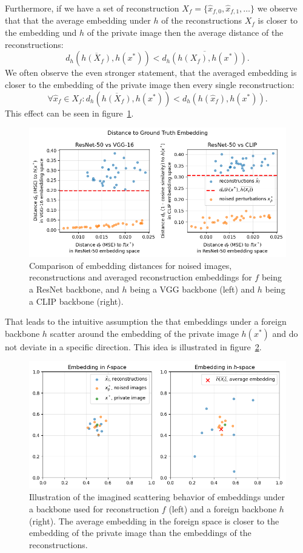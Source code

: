 \documentclass[10pt,twocolumn]{article}
\begin{document}
Furthermore, if we have a set of reconstruction $X_f = \{\hat x_{f,0}, \hat x_{f,1}, \dots\}$ we observe that that the average embedding under $h$ of the reconstructions $X_f$ is closer to the embedding und $h$ of the private image then the average distance of the reconstructions: $$d_h\left(\overline{h(X_f)}, h(x^*)\right) < \overline{d_h(h(X_f), h(x^*))}.$$
We often observe the even stronger statement, that the averaged embedding is closer to the embedding of the private image then every single reconstruction: $$\forall\hat x_f \in X_f: d_h\left(\overline{h(X_f)}, h(x^*)\right) < d_h(h(\hat x_f), h(x^*)).$$
This effect can be seen in figure~\ref{fig:avg_distance_scatter}.
\begin{figure}[ht]
    \centering
    \includegraphics[width=\linewidth]{figures/avg-distance-scatter.png}
    \caption{
       Comparison of embedding distances for noised images, reconstructions and averaged reconstruction embeddings for $f$ being a ResNet backbone, and $h$ being a VGG backbone (left) and $h$ being a CLIP backbone (right).
    }
    \label{fig:avg_distance_scatter}
\end{figure}

That leads to the intuitive assumption the that embeddings under a foreign backbone $h$ scatter around the embedding of the private image $h(x^*)$ and do not deviate in a specific direction.
This idea is illustrated in figure~\ref{fig:avg_embedding_sketch}.
\begin{figure}[ht]
    \centering
    \includegraphics[width=\linewidth]{figures/avg-embedding-sketch.png}
    \caption{
       Illustration of the imagined scattering behavior of embeddings under a backbone used for reconstruction $f$ (left) and a foreign backbone $h$ (right).
       The average embedding in the foreign space is closer to the embedding of the private image than the embeddings of the reconstructions.
    }
    \label{fig:avg_embedding_sketch}
\end{figure}
\end{document}
